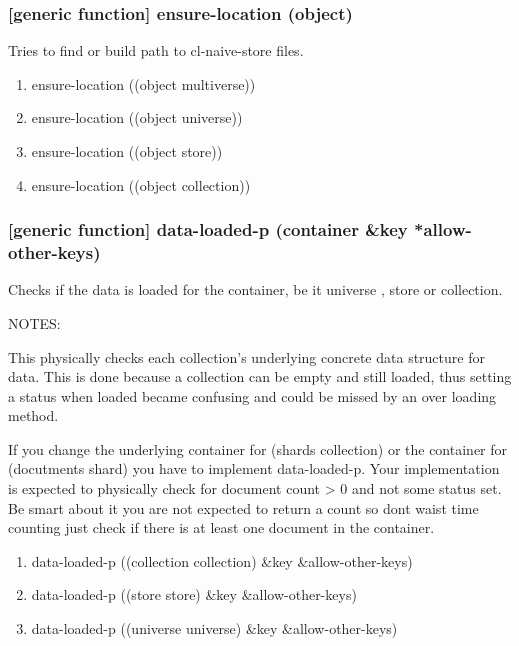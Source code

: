 \documentclass[11pt]{article}
\begin{document}
\subsubsection{[generic function] ensure-location (object)}
\label{sec:org26fb6ee}

Tries to find or build path to cl-naive-store files.

\begin{enumerate}
\item ensure-location ((object multiverse))
\label{sec:orgb9b4329}
\item ensure-location ((object universe))
\label{sec:org8ee120d}
\item ensure-location ((object store))
\label{sec:org4f4b016}
\item ensure-location ((object collection))
\label{sec:orgb25f329}
\end{enumerate}

\subsubsection{[generic function] data-loaded-p (container \&key *allow-other-keys)}
\label{sec:org34765e8}

Checks if the data is loaded for the container, be it universe , store or collection.

NOTES:

This physically checks each collection's underlying concrete data structure for data. This is done because a collection can be empty and still loaded, thus setting a status when loaded became confusing and could be missed by an over loading method.

If you change the underlying container for (shards collection) or the
container for (docutments shard) you have to implement
data-loaded-p. Your implementation is expected to physically check for
document count > 0 and not some status set. Be smart about it you are
not expected to return a count so dont waist time counting just check
if there is at least one document in the container.


\begin{enumerate}
\item data-loaded-p ((collection collection) \&key \&allow-other-keys)
\label{sec:orgf02fc28}

\item data-loaded-p ((store store) \&key \&allow-other-keys)
\label{sec:org43f0f5d}

\item data-loaded-p ((universe universe) \&key \&allow-other-keys)
\label{sec:org0b2e76f}
\end{enumerate}
\end{document}
